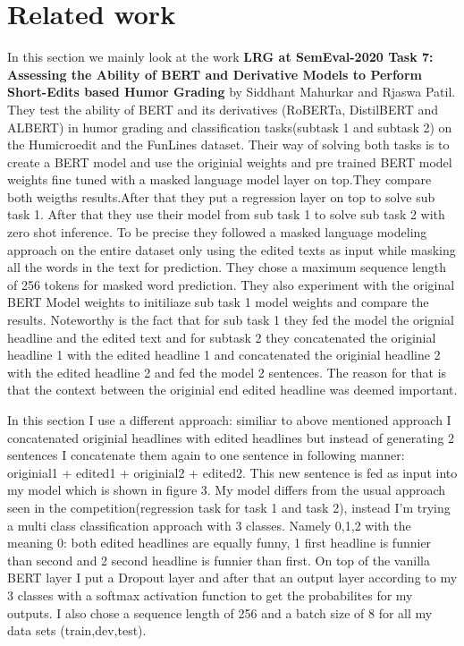\documentclass[11pt,a4paper,onecolumn,oneside,notitlepage]{article}
\begin{document}
	\section{Related work}
		In this section we mainly look at the work \textbf{LRG at SemEval-2020 Task 7: Assessing the Ability of BERT and
		Derivative Models to Perform Short-Edits based Humor Grading} by Siddhant Mahurkar and Rjaswa Patil. 
		They test the ability of BERT and its derivatives (RoBERTa, DistilBERT and ALBERT) in humor grading and classification tasks(subtask 1 and subtask 2) on the Humicroedit and the FunLines dataset.
		Their way of solving both tasks is to create a  BERT model and use the originial weights and  pre trained BERT model weights  fine tuned  with a masked language model layer on top.They compare both weigths results.After that they put a regression layer on top to solve sub task 1. After that they use their model from sub task 1 to solve sub task 2 with zero shot inference. 
		To be precise they followed a masked language modeling approach on the entire dataset only using the edited texts as input while masking all the words in the text for prediction. They chose a maximum sequence length of 256 tokens for masked word prediction. They also experiment with the original BERT Model weights to initiliaze sub task 1 model weights and compare the results.
		Noteworthy is the fact that for sub  task 1 they fed the model the orignial headline and the edited text and for subtask 2 they concatenated the originial headline 1 with the edited headline 1 and concatenated the originial headline 2 with the edited headline 2 and fed the model 2 sentences.
		The reason for that is that the context between the originial end edited headline was deemed important.


	In this section I use a different approach: similiar to above mentioned approach I concatenated originial headlines with edited headlines but instead of generating 2 sentences I concatenate them again to one sentence in following manner: originial1 + edited1 + originial2 + edited2.
	This new sentence is fed as input into my model which is shown in figure 3.
	My model differs from the usual approach seen in the competition(regression task for task 1 and task 2), instead I'm trying a multi class classification approach with 3 classes. Namely 0,1,2 with the meaning 0: both edited headlines are equally funny, 1 first headline is funnier than second and 2 second headline is funnier than first.
	On top of the vanilla BERT layer I put a Dropout layer and after that an output layer according to my 3 classes with a softmax activation function to get the probabilites for my outputs. 
	I also chose a sequence length of 256 and a batch size of 8 for all my data sets (train,dev,test).
	
\end{document}
